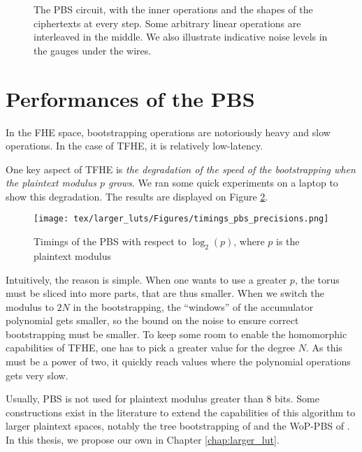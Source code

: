 \begin{figure}
	\centering
	
	\caption{The PBS circuit, with the inner operations and the shapes of the ciphertexts at every step. Some arbitrary linear operations are interleaved in the middle. We also illustrate indicative noise levels in the gauges under the wires.}
	\label{fig:PBS_layout}
\end{figure}


\section{Performances of the PBS}
\label{sec:pbs_performances}


In the FHE space, bootstrapping operations are notoriously heavy and slow operations. In the case of TFHE, it is relatively low-latency. 

One key aspect of TFHE is \textit{the degradation of the speed of the bootstrapping when the plaintext modulus $p$ grows}. We ran some quick experiments on a laptop to show this degradation. The results are displayed on Figure \ref{fig:PBS_perfs}.


\begin{figure}
	\centering
	\texttt{[image: tex/larger\_luts/Figures/timings\_pbs\_precisions.png]}
	\caption{Timings of the PBS with respect to $\log_2(p)$, where $p$ is the plaintext modulus}
	\label{fig:PBS_perfs}
\end{figure}



Intuitively, the reason is simple. When one wants to use a greater $p$, the torus must be sliced into more parts, that are thus smaller. When we switch the modulus to $2N$ in the bootstrapping, the ``windows'' of the accumulator polynomial gets smaller, so the bound on the noise to ensure correct bootstrapping must be smaller. To keep some room to enable the homomorphic capabilities of TFHE, one has to pick a greater value for the degree $N$. As this must be a power of two, it quickly reach values where the polynomial operations gets very slow.

Usually, PBS is not used for plaintext modulus greater than 8 bits. Some constructions exist in the literature to extend the capabilities of this algorithm to larger plaintext spaces, notably the tree bootstrapping of \cite{TCHES:GuiBorAra21} and the WoP-PBS of \cite{AC:CLOT21}. In this thesis, we propose our own in Chapter \ref{chap:larger_lut}.




